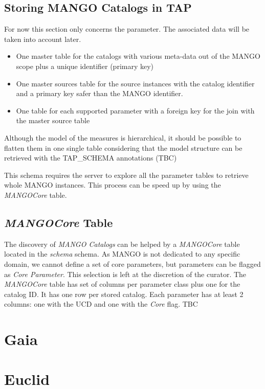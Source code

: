 \documentclass[11pt,a4paper]{ivoa}
\begin{document}
\begin{itemize}
\subsection{Storing MANGO Catalogs in TAP}
For now this section only concerns the parameter. The associated data will be taken into account later.

\begin{itemize}
  \item One master table for the catalogs with various meta-data out of the MANGO scope plus a unique identifier (primary key)
  \item One master sources table for the source instances with the catalog identifier and a primary key safer than the MANGO identifier.
  \item One table for each supported parameter with a foreign key for the join with the master source table
\end{itemize}

Although the model of the measures is hierarchical, it should be possible to flatten them in one single table considering that the model structure can be retrieved with the TAP\_SCHEMA annotations (TBC)

This schema requires the server to explore all the parameter tables to retrieve  whole MANGO instances. This process can be speed up by using the \emph{MANGOCore} table.

\subsection{ \emph{MANGOCore} Table}

The discovery of \emph{MANGO Catalogs} can be helped by a  \emph{MANGOCore} table located in the  \emph{schema} schema. As MANGO is not dedicated to any specific domain, we cannot define a set of core parameters, but parameters can be flagged as \emph{Core Parameter}. This selection is left at the discretion of the curator.
The \emph{MANGOCore} table has set of columns per parameter class plus one for the catalog ID. It has one row per stored catalog. Each parameter has at least 2 columns: one with the UCD and one with the \emph{Core} flag. TBC


\appendix

\section{Gaia}


\section{Euclid}



\end{itemize}
\end{document}
